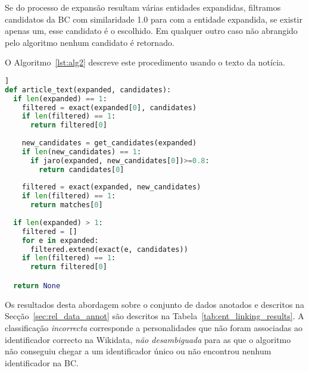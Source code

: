 \documentclass[a4paper, twocolumn, 11pt, twoside]{article}
\begin{document}
Se do processo de expansão resultam várias entidades expandidas, filtramos candidatos da BC com similaridade 1.0 para com a entidade expandida, se existir apenas um, esse candidato é o escolhido. Em qualquer outro caso não abrangido pelo algoritmo nenhum candidato é retornado. 

O Algoritmo~\ref{lst:alg2} descreve este procedimento usando o texto da notícia.

\begin{lstlisting}[language=python,columns=fullflexible,frame=single,label={lst:alg2},title={Algoritmo 2. Ligação com a Wikidata usando o texto da notícia para expandir as entidades reconhecidas no título.},captionpos=b]]
def article_text(expanded, candidates):
  if len(expanded) == 1:
    filtered = exact(expanded[0], candidates)
	if len(filtered) == 1:
	  return filtered[0]
	  
    new_candidates = get_candidates(expanded)
    if len(new_candidates) == 1:
      if jaro(expanded, new_candidates[0])>=0.8:
        return candidates[0]
 
    filtered = exact(expanded, new_candidates)
    if len(filtered) == 1:
      return matches[0]
  
  if len(expanded) > 1:
    filtered = []
    for e in expanded:
      filtered.extend(exact(e, candidates))
    if len(filtered) == 1:
      return filtered[0]

  return None
\end{lstlisting}


\begin{comment}

\begin{lstlisting}[language=python,columns=fullflexible,label={lst:alg3},caption=News text approach.]]

def entity_linking(per):
    candidates = get_candidates(ent)
    wiki_id = title_only(per, candidates)
    if not wiki_id:
        expanded = expand(per, news_text)
        wiki_id = article_text(candidates, expanded)
    return wiki_id
\end{lstlisting}

\end{comment}


Os resultados desta abordagem sobre o conjunto de dados anotados e descritos na Secção~\ref{sec:rel_data_annot} são descritos na Tabela~\ref{tab:ent_linking_results}. A classificação \textit{incorrecta} corresponde a personalidades que não foram associadas ao identificador correcto na Wikidata, \textit{não desambiguada} para as que o algoritmo não conseguiu chegar a um identificador único ou não encontrou nenhum identificador na BC.
\end{document}
